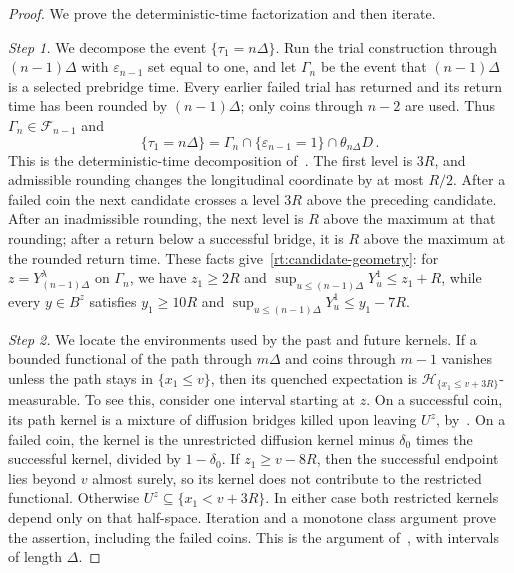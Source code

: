 \documentclass[11pt]{amsart}
\theoremstyle{definition}
\theoremstyle{remark}
\numberwithin{equation}{section}
\begin{document}
\begin{proof}
We prove the deterministic-time factorization and then iterate.

\emph{Step 1.} We decompose the event $\{\tau_1=n\Delta\}$. Run the trial construction through $(n-1)\Delta$ with $\varepsilon_{n-1}$ set equal to one, and let $\Gamma_n$ be the event that $(n-1)\Delta$ is a selected prebridge time. Every earlier failed trial has returned and its return time has been rounded by $(n-1)\Delta$; only coins through $n-2$ are used. Thus $\Gamma_n\in\mathcal F_{n-1}$ and
\begin{equation}\label{app:regen-slice}
 \{\tau_1=n\Delta\}
 =\Gamma_n\cap\{\varepsilon_{n-1}=1\}\cap\theta_{n\Delta}D\, .
\end{equation}
This is the deterministic-time decomposition of~\citet[Theorem~2.4, (2.20)]{ballistic2003shen}. The first level is $3R$, and admissible rounding changes the longitudinal coordinate by at most $R/2$. After a failed coin the next candidate crosses a level $3R$ above the preceding candidate. After an inadmissible rounding, the next level is $R$ above the maximum at that rounding; after a return below a successful bridge, it is $R$ above the maximum at the rounded return time. These facts give~\eqref{rt:candidate-geometry}: for $z=Y^\lambda_{(n-1)\Delta}$ on $\Gamma_n$, we have $z_1\geq2R$ and $\sup_{u\leq(n-1)\Delta}Y_u^1\leq z_1+R$, while every $y\in B^z$ satisfies $y_1\geq10R$ and $\sup_{u\leq(n-1)\Delta}Y_u^1\leq y_1-7R$.

\emph{Step 2.} We locate the environments used by the past and future kernels. If a bounded functional of the path through $m\Delta$ and coins through $m-1$ vanishes unless the path stays in $\{x_1\leq v\}$, then its quenched expectation is $\mathcal H_{\{x_1\leq v+3R\}}$-measurable. To see this, consider one interval starting at $z$. On a successful coin, its path kernel is a mixture of diffusion bridges killed upon leaving $U^z$, by~\citet[Theorem~2.1, (2.8)--(2.9)]{ballistic2003shen}. On a failed coin, the kernel is the unrestricted diffusion kernel minus $\delta_0$ times the successful kernel, divided by $1-\delta_0$. If $z_1\geq v-8R$, then the successful endpoint lies beyond $v$ almost surely, so its kernel does not contribute to the restricted functional. Otherwise $U^z\subseteq\{x_1<v+3R\}$. In either case both restricted kernels depend only on that half-space. Iteration and a monotone class argument prove the assertion, including the failed coins. This is the argument of~\citet[items~(3)--(4)]{ballistic2004shen}, with intervals of length $\Delta$.


\end{proof}
\end{document}
